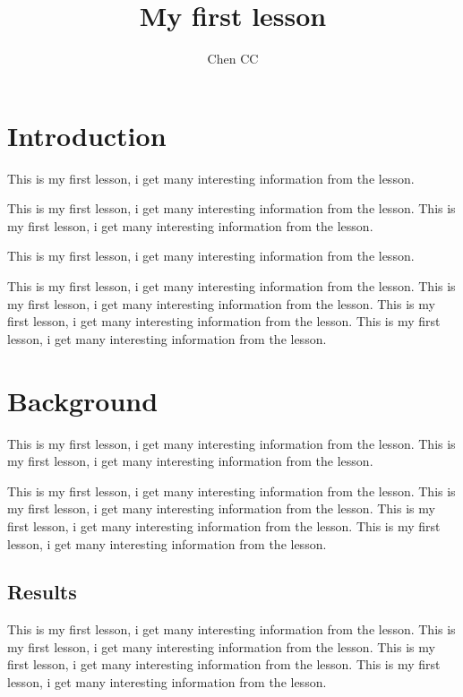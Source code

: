 \documentclass[12pt, twocolumn]{article}
\begin{document}
\title{My first lesson}
\author{Chen CC}
\maketitle

\section{Introduction}
This is my first lesson, i get many interesting information from the lesson. 

This is my first lesson, i get many interesting information from the lesson. This is my first lesson, i get many interesting information from the lesson. 

This is my first lesson, i get many interesting information from the lesson. 

This is my first lesson, i get many interesting information from the lesson. This is my first lesson, i get many interesting information from the lesson. This is my first lesson, i get many interesting information from the lesson. This is my first lesson, i get many interesting information from the lesson. 

\section{Background}
This is my first lesson, i get many interesting information from the lesson. This is my first lesson, i get many interesting information from the lesson. 

This is my first lesson, i get many interesting information from the lesson. This is my first lesson, i get many interesting information from the lesson. This is my first lesson, i get many interesting information from the lesson. This is my first lesson, i get many interesting information from the lesson. 

\subsection{Results}
This is my first lesson, i get many interesting information from the lesson. This is my first lesson, i get many interesting information from the lesson. This is my first lesson, i get many interesting information from the lesson. This is my first lesson, i get many interesting information from the lesson. 
\end{document}
